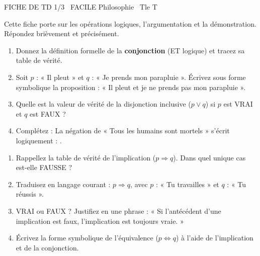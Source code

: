 \documentclass[11pt]{article}
\begin{document}
\begin{tcolorbox}[enhanced,colback=popink,colframe=popink,arc=10pt,boxrule=0pt,left=12pt,right=12pt,top=9pt,bottom=9pt]
{\color{white}\popxbold\small FICHE DE TD 1/3 \textbullet\ FACILE \hfill Philosophie \textbullet\ Tle T\par}
\end{tcolorbox}
\vspace{4pt}
Cette fiche porte sur les opérations logiques, l'argumentation et la démonstration. Répondez brièvement et précisément.

\begin{exercice}
\begin{enumerate}
    \item Donnez la définition formelle de la \textbf{conjonction} (ET logique) et tracez sa table de vérité.
    \item Soit $p$ : « Il pleut » et $q$ : « Je prends mon parapluie ». Écrivez sous forme symbolique la proposition : « Il pleut et je ne prends pas mon parapluie ».
    \item Quelle est la valeur de vérité de la disjonction inclusive ($p \lor q$) si $p$ est VRAI et $q$ est FAUX ?
    \item Complétez : La négation de « Tous les humains sont mortels » s'écrit logiquement : \underline{\hspace{5cm}}.
\end{enumerate}
\end{exercice}

\begin{exercice}
\begin{enumerate}
    \item Rappellez la table de vérité de l'implication ($p \Rightarrow q$). Dans quel unique cas est-elle FAUSSE ?
    \item Traduisez en langage courant : $p \Rightarrow q$, avec $p$ : « Tu travailles » et $q$ : « Tu réussis ».
    \item VRAI ou FAUX ? Justifiez en une phrase : « Si l'antécédent d'une implication est faux, l'implication est toujours vraie. »
    \item Écrivez la forme symbolique de l'équivalence ($p \Leftrightarrow q$) à l'aide de l'implication et de la conjonction.
\end{enumerate}
\end{exercice}
\end{document}
